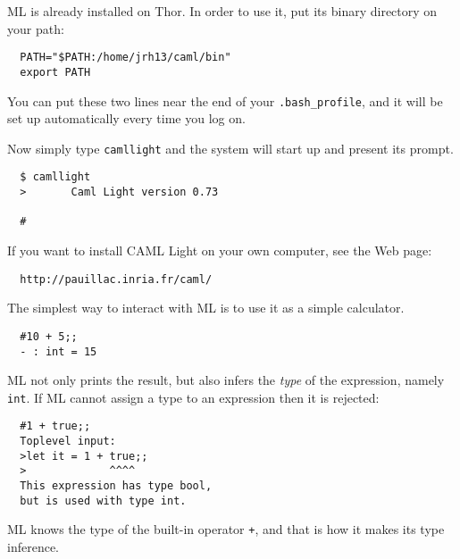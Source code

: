 \begin{slide*}


\vspace*{0.5cm}

ML is already installed on Thor. In order to use it, put its binary directory
on your path:
\begin{black}
\begin{verbatim}
  PATH="$PATH:/home/jrh13/caml/bin"
  export PATH
\end{verbatim}
\end{black}
You can put these two lines near the end of your {\black \tt .bash\_profile},
and it will be set up automatically every time you log on.

Now simply type {\black \tt camllight} and the system will start up and present
its prompt.
\begin{black}
\begin{verbatim}
  $ camllight
  >       Caml Light version 0.73

  #
\end{verbatim}
\end{black}

If you want to install CAML Light on your own computer, see the Web page:
\begin{black}
\begin{verbatim}
  http://pauillac.inria.fr/caml/
\end{verbatim}
\end{black}
\end{slide*}

\begin{slide*}


\vspace*{0.5cm}

The simplest way to interact with ML is to use it as a simple calculator.

\begin{black}
\begin{verbatim}
  #10 + 5;;
  - : int = 15
\end{verbatim}
\end{black}

ML not only prints the result, but also infers the {\em type} of the
expression, namely {\black \tt int}. If ML cannot assign a type to an
expression then it is rejected:

\begin{black}
\begin{verbatim}
  #1 + true;;
  Toplevel input:
  >let it = 1 + true;;
  >             ^^^^
  This expression has type bool,
  but is used with type int.
\end{verbatim}
\end{black}

ML knows the type of the built-in operator {\black \tt +}, and that is how it
makes its type inference.

\end{slide*}



